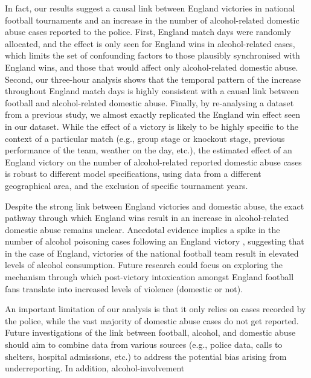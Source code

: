 \documentclass[12pt, a4paper]{article}
\begin{document}
In fact, our results suggest a causal link between England victories in national football tournaments and an increase in the number of alcohol-related domestic abuse cases reported to the police. First, England match days were randomly allocated, and the effect is only seen for England wins in alcohol-related cases, which limits the set of confounding factors to those plausibly synchronised with England wins, and those that would affect only alcohol-related domestic abuse. Second, our three-hour analysis shows that the temporal pattern of the increase throughout England match days is highly consistent with a causal link between football and alcohol-related domestic abuse. Finally, by re-analysing a dataset from a previous study, we almost exactly replicated the England win effect seen in our dataset. While the effect of a victory is likely to be highly specific to the context of a particular match (e.g., group stage or knockout stage, previous performance of the team, weather on the day, etc.), the estimated effect of an England victory on the number of alcohol-related reported domestic abuse cases is robust to different model specifications, using data from a different geographical area, and the exclusion of specific tournament years. 

Despite the strong link between England victories and domestic abuse, the exact pathway through which England wins result in an increase in alcohol-related domestic abuse remains unclear. Anecdotal evidence implies a spike in the number of alcohol poisoning cases following an England victory  \cite{Davies2018}, suggesting that in the case of England, victories of the national football team result in elevated levels of alcohol consumption. Future research could focus on exploring the mechanism through which post-victory intoxication amongst England football fans translate into increased levels of violence (domestic or not).


An important limitation of our analysis is that it only relies on cases recorded by the police, while the vast majority of domestic abuse cases do not get reported. Future investigations of the link between football, alcohol, and domestic abuse should aim to combine data from various sources (e.g., police data, calls to shelters, hospital admissions, etc.) to address the potential bias arising from underreporting. In addition, alcohol-involvement 
\end{document}
